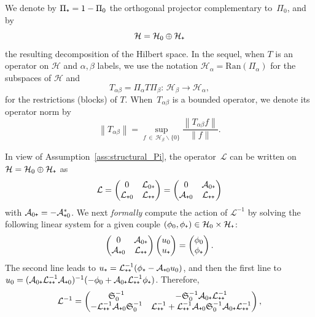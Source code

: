 \documentclass[AHL,Unicode,longabstracts,MathTools,published]{cedram}
\newcommand{\Ran}{\mathrm{Ran}}
\newcommand{\cL}{\mathcal{L}}
\newcommand{\cLa}{\mathcal{A}}
\newcommand{\cH}{\mathcal{H}}
\newcommand{\Schur}{\mathfrak{S}_0}
\newcommand{\subplus}{\textnormal{\texttt{+}}}
\begin{document}
We denote by $\Pi_{\subplus} = 1 - \Pi_{0}$ the orthogonal projector complementary to~$\Pi_{0}$, and by
\[
\cH = \cH_0 \oplus \cH_\subplus
\]
the resulting decomposition of the Hilbert space. In the sequel, when $T$ is an operator on $\cH$ and $\alpha,\beta$ labels, we use the notation $\cH_\alpha = {\Ran}(\Pi_\alpha)$ for the subspaces of $\cH$ and
\[
T_{\alpha\beta} = \Pi_{\alpha} T \Pi_{\beta}:\, \cH_{\beta} \to \cH_{\alpha},
\]
for the restrictions (blocks) of $T$. When~$T_{\alpha\beta}$ is a bounded operator, we denote its operator norm by
\[
\left\|T_{\alpha\beta}\right\| = \sup_{f\,\in\,\cH_\beta \backslash \{0\}} \frac{\left\|T_{\alpha\beta}f\right\|}{\|f\|}.
\]

In view of Assumption~\ref{ass:structural_Pi}, the operator~$\cL$ can be written on $\cH = \cH_{0} \oplus \cH_{\subplus}$ as
\begin{equation}\label{eq:saddle_point_like}
\cL =
\begin{pmatrix}
0 & \cL_{0\subplus}\\
\cL_{\subplus0} & \cL_{\subplus\subplus}
\end{pmatrix} =
\begin{pmatrix}
0 & \cLa_{0\subplus}\\
\cLa_{\subplus0} & \cL_{\subplus\subplus}
\end{pmatrix}
\end{equation}
with $\cLa_{0\subplus} = -\cLa_{\subplus0}^{*}$. We next \emph{formally} compute the action of $\cL^{-1}$ by solving the following linear system for a given couple $(\phi_{0},\phi_{\subplus}) \in \cH_0 \times \cH_\subplus$:
\[
\begin{pmatrix} 0 & \cLa_{0\subplus}\\
\cLa_{\subplus0} & \cL_{\subplus\subplus}
\end{pmatrix}
\begin{pmatrix} u_{0} \\ u_{\subplus}
\end{pmatrix} =
\begin{pmatrix} \phi_{0} \\ \phi_{\subplus}
\end{pmatrix}.
\]
The second line leads to $u_{\subplus} = \cL_{\subplus\subplus}^{-1}(\phi_{\subplus} - \cLa_{\subplus0} u_{0})$, and then the first line to $u_{0} = (\cLa_{0\subplus} \cL_{\subplus\subplus}^{-1} \cLa_{\subplus0})^{-1}(-\phi_{0} + \cLa_{0\subplus} \cL_{\subplus\subplus}^{-1} \phi_{\subplus})$. Therefore,
\begin{equation}\label{eq:formal_action_resolvent}
\cL^{-1} =
\begin{pmatrix}
\Schur^{-1} & -\Schur^{-1} \cLa_{0\subplus} \cL_{\subplus\subplus}^{-1}\\
-\cL_{\subplus\subplus}^{-1} \cLa_{\subplus0} \Schur^{-1} & \cL_{\subplus\subplus}^{-1} + \cL_{\subplus\subplus}^{-1} \cLa_{\subplus0} \Schur^{-1} \cLa_{0\subplus} \cL_{\subplus\subplus}^{-1}
\end{pmatrix},
\end{equation}
\end{document}
